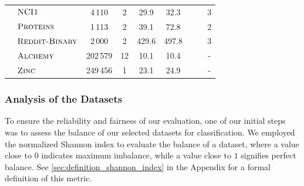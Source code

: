 \begin{table}[]
\begin{center}
{\begin{tabular}{@{}c <{\enspace}@{}lccccccc@{}}
				& $\textsc{NCI1}$          & 4\,110            & 2                         & 29.9                          & 32.3                          & \cmark                   & \xmark   & 3   \\
				& $\textsc{Proteins}$      & 1\,113            & 2                         & 39.1                          & 72.8                          & \cmark                   & \xmark  & 2    \\
				& $\textsc{Reddit-Binary}$ & 2\,000            & 2                         & 429.6                         & 497.8                         & \xmark                   & \xmark & 3     \\ 
				\midrule
				\multirow{2}{*}{\rotatebox{90}{Reg.}}
				& $\textsc{Alchemy}$       & 202\,579          & 12                        & 10.1                          & 10.4                         & \cmark                   & \cmark & -     \\
				& $\textsc{Zinc}$       & 249\,456          & 1                        & 23.1                         & 24.9                          & \cmark                   & \cmark & -     \\
				\bottomrule
			\end{tabular}}
		\label{tab:overview_datasets}
	\end{center}
\end{table}

\subsubsection{Analysis of the Datasets}
To ensure the reliability and fairness of our evaluation, one of our initial steps was to assess the balance of our selected datasets for classification. We employed the normalized Shannon index to evaluate the balance of a dataset, where a value close to $0$ indicates maximum imbalance, while a value close to $1$ signifies perfect balance. See \cref{sec:definition_shannon_index} in the Appendix for a formal definition of this metric.

\begin{table}[H]
	\caption{An overview of the normalized Shannon index calculated for each dataset.}
	\label{tab:shannon_index}
	\centering
\end{table}

